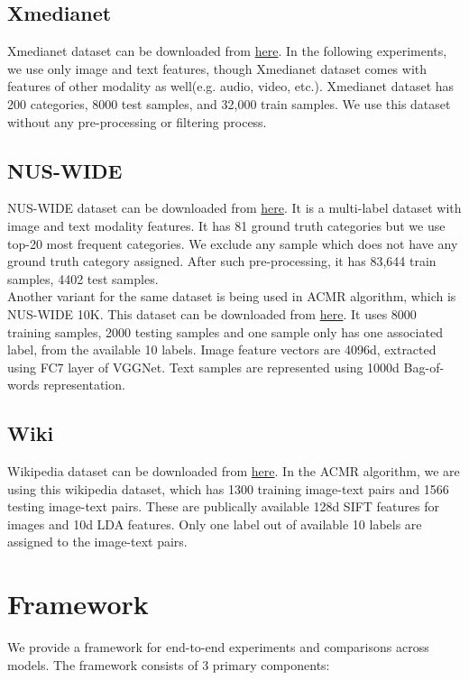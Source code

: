 \documentclass[10pt]{scrartcl}
\begin{document}
\subsection{Xmedianet}
    Xmedianet dataset can be downloaded from \href{https://drive.google.com/file/d/1OYv7IK5OdDmBQ_pRXMugnqZzR_j7HOsu/view?usp=sharing}{here}. In the following experiments, we use only image and text features, though Xmedianet dataset comes with features of other modality as well(e.g. audio, video, etc.). Xmedianet dataset has 200 categories, 8000 test samples, and 32,000 train samples. We use this dataset without any pre-processing or filtering process.
\subsection{NUS-WIDE}
    NUS-WIDE dataset can be downloaded from \href{https://lms.comp.nus.edu.sg/wp-content/uploads/2019/research/nuswide/NUS-WIDE.html}{here}. It is a multi-label dataset with image and text modality features. It has 81 ground truth categories but we use top-20 most frequent categories. We exclude any sample which does not have any ground truth category assigned. After such pre-processing, it has 83,644 train samples, 4402 test samples.\\
    Another variant for the same dataset is being used in ACMR algorithm, which is NUS-WIDE 10K.
    This dataset can be downloaded from \href{https://github.com/shivangibithel/ACMR_demo/tree/master/data}{here}. It uses 8000 training samples, 2000 testing samples and one sample only has one associated label, from the available 10 labels. Image feature vectors are 4096d, extracted using FC7 layer of VGGNet. Text samples are represented using 1000d Bag-of-words representation.   
\subsection{Wiki}
    Wikipedia dataset can be downloaded from \href{https://github.com/shivangibithel/ACMR_demo/tree/master/data/wikipedia_dataset}{here}.
    In the ACMR algorithm, we are using this wikipedia dataset, which has 1300 training image-text pairs and 1566 testing image-text pairs. These are publically available 128d SIFT features for images and 10d LDA features. Only one label out of available 10 labels are assigned to the image-text pairs. 

\section{Framework}
We provide a framework for end-to-end experiments and comparisons across models. The framework consists of 3 primary components:
\end{document}
